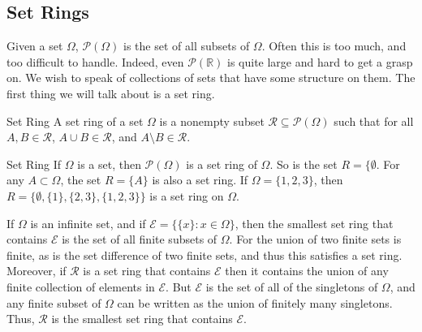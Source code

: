 \documentclass[crop=false,class=book,oneside]{standalone}                      %
\begin{document}
        \subsection{Set Rings}
            Given a set $\Omega$, $\mathcal{P}(\Omega)$ is the
            set of all subsets of $\Omega$. Often this is too
            much, and too difficult to handle. Indeed, even
            $\mathcal{P}(\mathbb{R})$ is quite large and hard
            to get a grasp on. We wish to speak of collections
            of sets that have some structure on them.
            The first thing we will talk about is a set ring.
            \begin{ldefinition}{Set Ring}
                A set ring of a set $\Omega$ is a nonempty subset
                $\mathcal{R}\subseteq\mathcal{P}(\Omega)$ such that
                for all $A,B\in\mathcal{R}$,
                $A\cup{B}\in\mathcal{R}$, and
                $A\setminus{B}\in\mathcal{R}$.
            \end{ldefinition}
            \begin{example}{Set Ring}
                If $\Omega$ is a set, then
                $\mathcal{P}(\Omega)$ is a set ring of
                $\Omega$. So is the set $R=\{\emptyset$.
                For any $A\subset\Omega$, the set
                $R=\{A\}$ is also a set ring. If
                $\Omega=\{1,2,3\}$, then
                $R=\{\emptyset,\{1\},\{2,3\},\{1,2,3\}\}$ is
                a set ring on $\Omega$.
            \end{example}
            \begin{lexample}
                If $\Omega$ is an infinite set, and if
                $\mathcal{E}=\big\{\{x\}:x\in\Omega\big\}$, then the
                smallest set ring that contains $\mathcal{E}$ is the set of
                all finite subsets of $\Omega$. For the union of two finite
                sets is finite, as is the set difference of two finite sets,
                and thus this satisfies a set ring. Moreover, if $\mathcal{R}$
                is a set ring that contains $\mathcal{E}$ then it contains the
                union of any finite collection of elements in $\mathcal{E}$.
                But $\mathcal{E}$ is the set of all of the singletons of
                $\Omega$, and any finite subset of $\Omega$ can be written
                as the union of finitely many singletons. Thus, $\mathcal{R}$
                is the smallest set ring that contains $\mathcal{E}$.
            \end{lexample}
\end{document}
